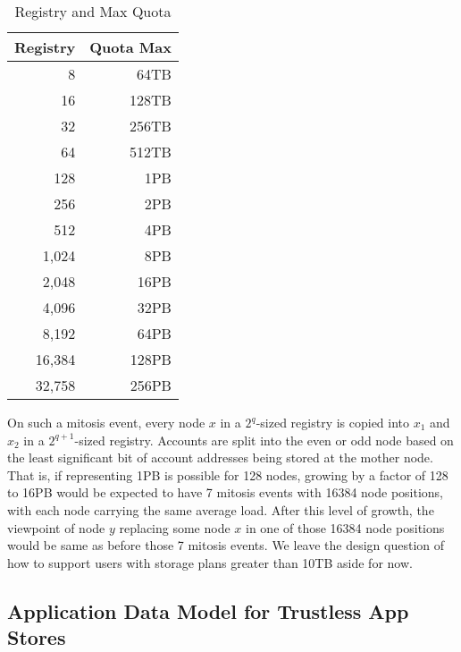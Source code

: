 \documentclass[journal]{IEEEtran}
\begin{document}
\begin{table}[]
    \centering
\begin{tabular}{r|r} \hline
Registry     & Quota Max \\ \hline
8            & 64TB   \\
16           & 128TB  \\
32           & 256TB  \\
64           & 512TB  \\
128          & 1PB    \\
256          & 2PB    \\
512          & 4PB    \\
1,024        & 8PB    \\
2,048        & 16PB   \\
4,096        & 32PB   \\
8,192        & 64PB   \\
16,384       & 128PB  \\
32,758       & 256PB  \\
\end{tabular}
    \caption{Registry and Max Quota}
    \label{tab:registrygrowth}
\end{table}

On such a mitosis event, every node $x$ in a $2^q$-sized registry is copied into $x_1$ and $x_2$ in a $2^{q+1}$-sized registry.  Accounts are split into the even or odd node based on the least significant bit of account addresses being stored at the mother node.
That is, if representing 1PB is possible for 128 nodes, growing by a factor of 128 to 16PB would be expected to have 7 mitosis events with 16384 node positions, with each node carrying the same average load.
After this level of growth, the viewpoint of node $y$ replacing some node $x$ in one of those 16384 node positions would be same as before those 7 mitosis events.  We leave the design question of how to support users with storage plans greater than 10TB aside for now.

\subsection{Application Data Model for Trustless App Stores}
\label{sec:jsonld}
\end{document}
